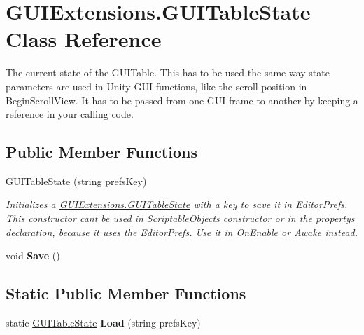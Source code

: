 \hypertarget{class_g_u_i_extensions_1_1_g_u_i_table_state}{}\section{G\+U\+I\+Extensions.\+G\+U\+I\+Table\+State Class Reference}
\label{class_g_u_i_extensions_1_1_g_u_i_table_state}


The current state of the G\+U\+I\+Table. This has to be used the same way state parameters are used in Unity G\+UI functions, like the scroll position in Begin\+Scroll\+View. It has to be passed from one G\+UI frame to another by keeping a reference in your calling code.  


\subsection*{Public Member Functions}
\begin{DoxyCompactItemize}
\item 
\mbox{\hyperlink{class_g_u_i_extensions_1_1_g_u_i_table_state_aa1c174fc584bf84ed57022fc04171298}{G\+U\+I\+Table\+State}} (string prefs\+Key)
\begin{DoxyCompactList}\small\item\em Initializes a \mbox{\hyperlink{class_g_u_i_extensions_1_1_g_u_i_table_state}{G\+U\+I\+Extensions.\+G\+U\+I\+Table\+State}} with a key to save it in Editor\+Prefs. This constructor can\textquotesingle{}t be used in Scriptable\+Object\textquotesingle{}s constructor or in the property\textquotesingle{}s declaration, because it uses the Editor\+Prefs. Use it in On\+Enable or Awake instead. \end{DoxyCompactList}\item 
\mbox{\label{class_g_u_i_extensions_1_1_g_u_i_table_state_a2cabd40983f3ded2a1b8aaf2ffd6ecf5}} 
void {\bfseries Save} ()
\end{DoxyCompactItemize}
\subsection*{Static Public Member Functions}
\begin{DoxyCompactItemize}
\item 
\mbox{\label{class_g_u_i_extensions_1_1_g_u_i_table_state_a15b8622c85e889c4ae225537684a9970}} 
static \mbox{\hyperlink{class_g_u_i_extensions_1_1_g_u_i_table_state}{G\+U\+I\+Table\+State}} {\bfseries Load} (string prefs\+Key)
\end{DoxyCompactItemize}
